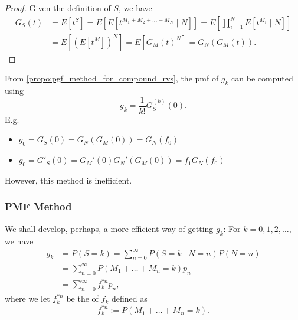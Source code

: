 \documentclass[notoc,notitlepage]{tufte-book}
\begin{document}
\begin{proof}
  Given the definition of $S$, we have
  \begin{align*}
    G_S(t) &= E \left[ t^S \right] = E \left[ E \left[ t^{M_1 + M_2 + \hdots + M_N} \mid N \right] \right] = E \left[ \prod_{i=1}^{N} E \left[ t^{M_i} \mid N \right] \right] \\
           &= E \left[ \left( E \left[ t^M \right] \right)^N \right] = E \left[ G_M(t)^N \right] = G_N( G_M(t) ).
  \end{align*}
\end{proof}

\begin{note}
  From \cref{propo:pgf_method_for_compound_rvs}, the pmf of $g_k$ can be computed using
    \begin{equation*}
      g_k = \frac{1}{k!}G_S^{(k)}(0).
    \end{equation*}
  E.g.
    \begin{itemize}
      \item $g_0 = G_S(0) = G_N(G_M(0)) = G_N(f_0)$
      \item $g_0 = G'_S(0) = G_M'(0) G_N'( G_M(0) ) = f_1 G_N(f_0)$
    \end{itemize}
  However, this method is inefficient.
\end{note}


\subsubsection{PMF Method}%
\label{ssub:pmf_method}

We shall develop, perhaps, a more efficient way of getting $g_k$: For $k = 0, 1, 2, \ldots$, we have
\begin{align*}
  g_k &= P(S = k) = \sum_{n=0}^{\infty} P(S = k \mid N = n) P(N = n) \\
      &= \sum_{n = 0}^{\infty} P ( M_1 + \hdots + M_n = k ) p_n \\
      &= \sum_{n=0}^{\infty} f_k^{*n} p_n,
\end{align*}
where we let $f_k^{*n}$ be the  of $f_k$ defined as
\begin{equation*}
  f_k^{*n} := P( M_1 + \hdots + M_n = k ).
\end{equation*}
\end{document}
